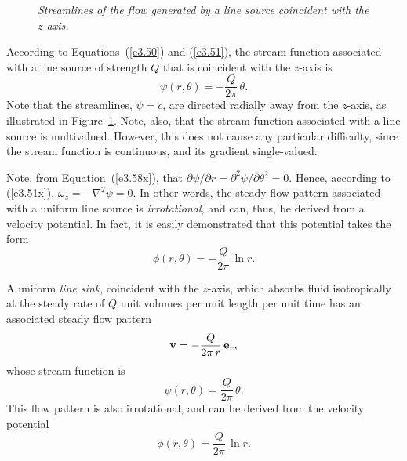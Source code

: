 \begin{figure}
\epsfysize=3.25in
\centerline{}
\caption{\em Streamlines of the flow generated by a line source coincident with the $z$-axis.}\label{fsource}
\end{figure}

According to Equations~(\ref{e3.50}) and (\ref{e3.51}), the stream function associated with a line source
of strength $Q$ that is coincident with the $z$-axis is
\begin{equation}\label{e3.58x}
\psi(r,\theta) = -\frac{Q}{2\pi}\,\theta.
\end{equation}
Note that the streamlines, $\psi=c$, are directed radially away from the $z$-axis, as illustrated in Figure~\ref{fsource}. 
Note, also, that the stream function associated with a line source is multivalued. However, this does not cause any
particular difficulty,
since the stream function is continuous, and its gradient single-valued. 

Note, from Equation~(\ref{e3.58x}), that $\partial\psi/\partial r=\partial^2\psi/\partial\theta^2=0$. Hence,
according to (\ref{e3.51x}), $\omega_z=-\nabla^2\psi=0$. In other words, the steady flow pattern
associated with a uniform line source is {\em irrotational}, and can, thus, be derived from a velocity
potential. In fact, it is easily demonstrated that this potential takes the form
\begin{equation}
\phi(r,\theta) = -\frac{Q}{2\pi}\,\ln r.
\end{equation}

A uniform {\em line sink}, coincident with the $z$-axis,
which absorbs  fluid isotropically at the steady rate of $Q$ unit volumes per unit length per unit time
has an associated steady flow pattern
\begin{equation}
{\bf v} = - \frac{Q}{2\pi\,r}\,{\bf e}_r,
\end{equation}
whose stream function is
\begin{equation}\label{e3.58}
\psi(r,\theta) = \frac{Q}{2\pi}\,\theta.
\end{equation}
This flow pattern is also irrotational, and can be derived from the velocity potential
\begin{equation}
\phi(r,\theta) = \frac{Q}{2\pi}\,\ln r.
\end{equation}

